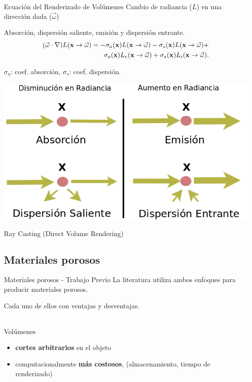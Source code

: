 \documentclass[spanish,unknownkeysallowed]{beamer}
\begin{document}
\begin{frame}{Ecuación del Renderizado de Volúmenes}
Cambio de radiancia ($L$) en una dirección dada ($\vec{\omega}$) 

Absorción, dispersión saliente, emisión y dispersión entrante.
\begin{equation*}
\begin{aligned}
(\vec{\omega} \cdot \nabla) L(\bold{x} \rightarrow \vec{\omega}) = - \sigma_{a}(\bold{x}) L(\bold{x} \rightarrow \vec{\omega}) - \sigma_{s}(\bold{x}) L(\bold{x} \rightarrow \vec{\omega}) + \\
\sigma_{a}(\bold{x}) L_{e}(\bold{x} \rightarrow \vec{\omega}) + \sigma_{s}(\bold{x}) L_{i}(\bold{x} \rightarrow \vec{\omega}).
\end{aligned}
\end{equation*}

$\sigma_{a}$: coef. absorción, $\sigma_{s}$: coef. dispersión.


\centering
\includegraphics[scale = 0.3]{../figures/fenomenosrte}

Ray Casting (Direct Volume Rendering)
\end{frame}



\subsection{Materiales porosos}


\begin{frame}{Materiales porosos - Trabajo Previo}
La literatura utiliza ambos enfoques para producir materiales porosos.

Cada uno de ellos con ventajas y desventajas.

\ \\

Volúmenes
\begin{block}{}
\begin{itemize}
\item \textbf{cortes arbitrarios} en el objeto
\item computacionalmente \textbf{más costosos}, (almacenamiento, tiempo de renderizado)
\end{itemize}
\end{block}
\end{frame}
\end{document}
